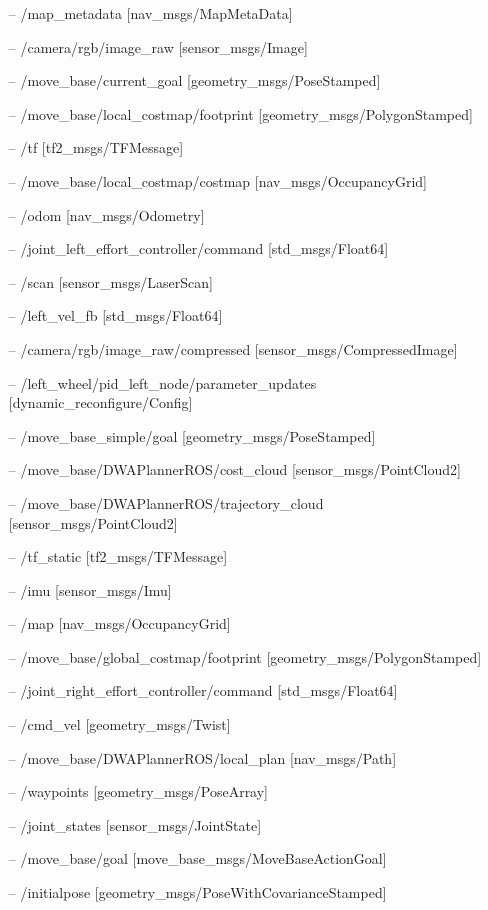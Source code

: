 \documentclass[12]{article}
\begin{document}
\begin{itemize}
\item[--] /map\_metadata [nav\_msgs/MapMetaData]
\item[--] /camera/rgb/image\_raw [sensor\_msgs/Image]
\item[--] /move\_base/current\_goal [geometry\_msgs/PoseStamped]
\item[--] /move\_base/local\_costmap/footprint [geometry\_msgs/PolygonStamped]
\item[--] /tf [tf2\_msgs/TFMessage]
\item[--] /move\_base/local\_costmap/costmap [nav\_msgs/OccupancyGrid]
\item[--] /odom [nav\_msgs/Odometry]
\item[--] /joint\_left\_effort\_controller/command [std\_msgs/Float64]
\item[--] /scan [sensor\_msgs/LaserScan]
\item[--] /left\_vel\_fb [std\_msgs/Float64]
\item[--] /camera/rgb/image\_raw/compressed [sensor\_msgs/CompressedImage]
\item[--] /left\_wheel/pid\_left\_node/parameter\_updates [dynamic\_reconfigure/Config]
\item[--] /move\_base\_simple/goal [geometry\_msgs/PoseStamped]
\item[--] /move\_base/DWAPlannerROS/cost\_cloud [sensor\_msgs/PointCloud2]
\item[--] /move\_base/DWAPlannerROS/trajectory\_cloud [sensor\_msgs/PointCloud2]
\item[--] /tf\_static [tf2\_msgs/TFMessage]
\item[--] /imu [sensor\_msgs/Imu]
\item[--] /map [nav\_msgs/OccupancyGrid]
\item[--] /move\_base/global\_costmap/footprint [geometry\_msgs/PolygonStamped]
\item[--] /joint\_right\_effort\_controller/command [std\_msgs/Float64]
\item[--] /cmd\_vel [geometry\_msgs/Twist]
\item[--] /move\_base/DWAPlannerROS/local\_plan [nav\_msgs/Path]
\item[--] /waypoints [geometry\_msgs/PoseArray]
\item[--] /joint\_states [sensor\_msgs/JointState]
\item[--] /move\_base/goal [move\_base\_msgs/MoveBaseActionGoal]
\item[--] /initialpose [geometry\_msgs/PoseWithCovarianceStamped]

\end{itemize}
\end{document}
